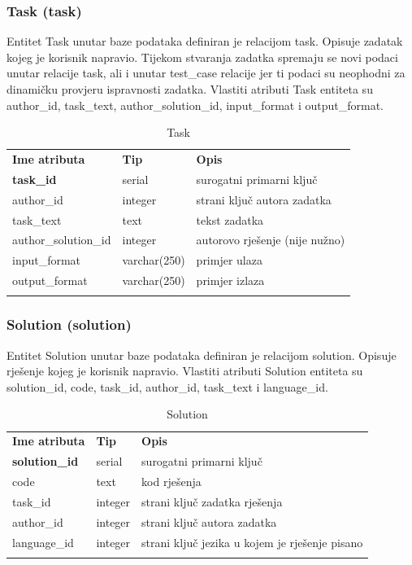 \documentclass[times, utf8, zavrsni]{fer}
\begin{document}
		\subsubsection{Task (task)}
		Entitet Task unutar baze podataka definiran je relacijom task. Opisuje zadatak kojeg je korisnik napravio. Tijekom stvaranja zadatka spremaju se novi podaci unutar relacije task, ali i unutar test\_case relacije jer ti podaci su neophodni za dinamičku provjeru ispravnosti zadatka. Vlastiti atributi Task entiteta su author\_id, task\_text, author\_solution\_id, input\_format i output\_format.
		\begin{table}[H]
			\caption{Task}
			\label{tbl:task}
			\centering
			\begin{tabu} to \textwidth {XXX}
				\tabucline[1.75pt]{-}
				\textbf{Ime atributa} & \textbf{Tip} & \textbf{Opis}\\ 				
				\tabucline[1pt]{-}
				\textbf{task\_id} & serial & surogatni primarni ključ\\ \hline
				author\_id & integer & strani ključ autora zadatka\\ \hline
				task\_text & text & tekst zadatka\\ \hline
				author\_solution\_id & integer & autorovo rješenje (nije nužno)\\ \hline
				input\_format & varchar(250) & primjer ulaza\\ \hline
				output\_format & varchar(250) & primjer izlaza\\ \hline
				\tabucline[1.75pt]{-}
			\end{tabu}
		\end{table}
	
		\subsubsection{Solution (solution)}
		Entitet Solution unutar baze podataka definiran je relacijom solution. Opisuje rješenje  kojeg je korisnik napravio. Vlastiti atributi Solution entiteta su solution\_id, code, task\_id, author\_id, task\_text i language\_id.
		\begin{table}[H]
			\caption{Solution}
			\label{tbl:solution}
			\centering
			\begin{tabu} to \textwidth {XXX}
				\tabucline[1.75pt]{-}
				\textbf{Ime atributa} & \textbf{Tip} & \textbf{Opis}\\ 				
				\tabucline[1pt]{-}
				\textbf{solution\_id} & serial & surogatni primarni ključ\\ \hline
				code & text & kod rješenja\\ \hline
				task\_id & integer & strani ključ zadatka rješenja\\ \hline
				author\_id & integer & strani ključ autora zadatka\\ \hline
				language\_id & integer & strani ključ jezika u kojem je rješenje pisano\\ \hline
				\tabucline[1.75pt]{-}
			\end{tabu}
		\end{table}
	
\end{document}
